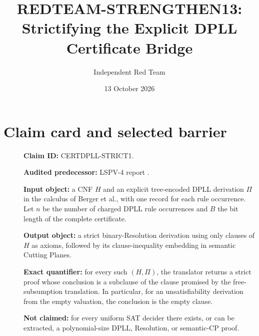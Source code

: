 \documentclass[11pt]{article}
\title{REDTEAM-STRENGTHEN13:\\Strictifying the Explicit DPLL Certificate Bridge}
\author{Independent Red Team}
\date{13 October 2026}
\begin{document}
\sloppy
\maketitle

\begin{center}
\end{center}

\section{Claim card and selected barrier}
\begin{description}
\item[] \textbf{Claim ID:} CERTDPLL-STRICT1.
\item[] \textbf{Audited predecessor:} LSPV-4 report
.
\item[] \textbf{Input object:} a CNF $H$ and an explicit tree-encoded DPLL
derivation $\Pi$ in the calculus of Berger et al., with one record for each
rule occurrence.  Let $n$ be the number of charged DPLL rule occurrences and
$B$ the bit length of the complete certificate.
\item[] \textbf{Output object:} a strict binary-Resolution derivation using
only clauses of $H$ as axioms, followed by its clause-inequality embedding in
semantic Cutting Planes.
\item[] \textbf{Exact quantifier:} for every such $(H,\Pi)$, the translator
returns a strict proof whose conclusion is a subclause of the clause promised
by the free-subsumption translation.  In particular, for an unsatisfiability
derivation from the empty valuation, the conclusion is the empty clause.
\item[] \textbf{Not claimed:} for every uniform SAT decider there exists, or
can be extracted, a polynomial-size DPLL, Resolution, or semantic-CP proof.
\end{description}
\end{document}
